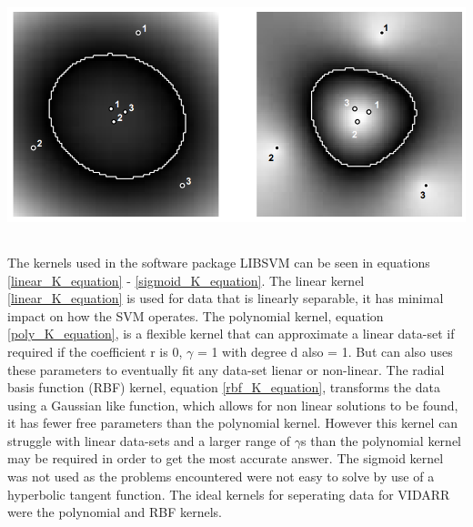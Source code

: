 \documentclass[12pt,a4paper]{article}
\newenvironment{Figure}
  {\par\medskip\noindent\minipage{\linewidth}}
  {\endminipage\par\medskip}
\begin{document}
\begin{Figure}
 \centering
 \includegraphics[height=71mm]{Kernel_svm_examples_boser.png}
 \label{svm_kernels}
\end{Figure} 

The kernels used in the software package LIBSVM \cite{libsvm_paper} can be seen in equations \ref{linear_K_equation} - \ref{sigmoid_K_equation}. The linear kernel \ref{linear_K_equation} is used for data that is linearly separable, it has minimal impact on how the SVM operates. The polynomial kernel, equation \ref{poly_K_equation}, is a flexible kernel that can approximate a linear data-set if required if the coefficient r is 0, $\gamma$ = 1 with degree d also = 1. But can also uses these parameters to eventually fit any data-set lienar or non-linear. The radial basis function (RBF) kernel, equation \ref{rbf_K_equation}, transforms the data using a Gaussian like function, which allows for non linear solutions to be found, it has fewer free parameters than the polynomial kernel. However this kernel can struggle with linear data-sets and a larger range of $\gamma$s than the polynomial kernel may be required in order to get the most accurate answer. The sigmoid kernel was not used as the problems encountered were not easy to solve by use of a hyperbolic tangent function. The ideal kernels for seperating data for VIDARR were the polynomial and RBF kernels.  
\end{document}
